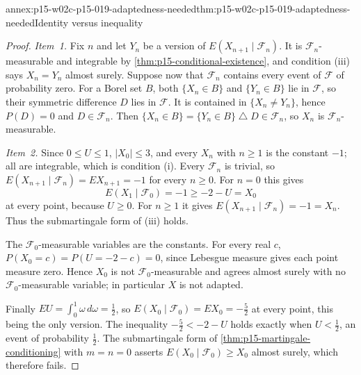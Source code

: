\begin{annexitem}{annex:p15-w02c-p15-019-adaptedness-needed}{thm:p15-w02c-p15-019-adaptedness-needed}{Identity versus inequality}
\begin{proof}
\emph{Item~1.} Fix \(n\) and let \(Y_n\) be a version of
\(E(X_{n+1}\mid\mathcal F_n)\). It is \(\mathcal F_n\)-measurable and
integrable by \cref{thm:p15-conditional-existence}, and condition (iii)
says \(X_n=Y_n\) almost surely. Suppose now that \(\mathcal F_n\)
contains every event of \(\mathcal F\) of probability zero. For a Borel
set \(B\), both \(\{X_n\in B\}\) and \(\{Y_n\in B\}\) lie in
\(\mathcal F\), so their symmetric difference \(D\) lies in
\(\mathcal F\). It is contained in \(\{X_n\neq Y_n\}\), hence
\(P(D)=0\) and \(D\in\mathcal F_n\). Then
\(\{X_n\in B\}=\{Y_n\in B\}\mathbin{\triangle}D\in\mathcal F_n\), so
\(X_n\) is \(\mathcal F_n\)-measurable.

\emph{Item~2.} Since \(0\leq U\leq1\), \(|X_0|\leq3\), and every
\(X_n\) with \(n\geq1\) is the constant \(-1\); all are integrable,
which is condition (i). Every \(\mathcal F_n\) is trivial, so
\(E(X_{n+1}\mid\mathcal F_n)=EX_{n+1}=-1\) for every \(n\geq0\). For
\(n=0\) this gives
\[
       E(X_1\mid\mathcal F_0)=-1\geq-2-U=X_0
\]
at every point, because \(U\geq0\). For \(n\geq1\) it gives
\(E(X_{n+1}\mid\mathcal F_n)=-1=X_n\). Thus the submartingale form of
(iii) holds.

The \(\mathcal F_0\)-measurable variables are the constants. For every
real \(c\), \(P(X_0=c)=P(U=-2-c)=0\), since Lebesgue measure gives
each point measure zero. Hence \(X_0\) is not \(\mathcal F_0\)-measurable
and agrees almost surely with no \(\mathcal F_0\)-measurable variable;
in particular \(X\) is not adapted.

Finally \(EU=\int_0^1\omega\,d\omega=\tfrac12\), so
\(E(X_0\mid\mathcal F_0)=EX_0=-\tfrac52\) at every point, this being the
only version. The inequality \(-\tfrac52<-2-U\) holds exactly when
\(U<\tfrac12\), an event of probability \(\tfrac12\). The submartingale
form of \cref{thm:p15-martingale-conditioning} with \(m=n=0\) asserts
\(E(X_0\mid\mathcal F_0)\geq X_0\) almost surely, which therefore fails.
\end{proof}
\end{annexitem}

